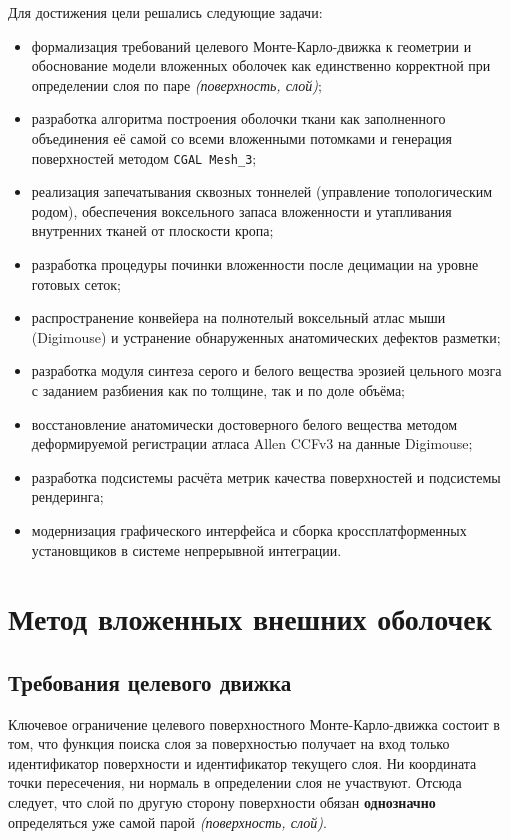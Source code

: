 \documentclass[a4paper,14pt]{article}
\begin{document}
Для достижения цели решались следующие задачи:
\begin{itemize}
    \item формализация требований целевого Монте-Карло-движка к геометрии и обоснование модели вложенных оболочек как единственно корректной при определении слоя по паре \emph{(поверхность, слой)};
    \item разработка алгоритма построения оболочки ткани как заполненного объединения её самой со всеми вложенными потомками и генерация поверхностей методом \texttt{CGAL Mesh\_3};
    \item реализация запечатывания сквозных тоннелей (управление топологическим родом), обеспечения воксельного запаса вложенности и утапливания внутренних тканей от плоскости кропа;
    \item разработка процедуры починки вложенности после децимации на уровне готовых сеток;
    \item распространение конвейера на полнотелый воксельный атлас мыши (Digimouse) и устранение обнаруженных анатомических дефектов разметки;
    \item разработка модуля синтеза серого и белого вещества эрозией цельного мозга с заданием разбиения как по толщине, так и по доле объёма;
    \item восстановление анатомически достоверного белого вещества методом деформируемой регистрации атласа Allen CCFv3 на данные Digimouse;
    \item разработка подсистемы расчёта метрик качества поверхностей и подсистемы рендеринга;
    \item модернизация графического интерфейса и сборка кроссплатформенных установщиков в системе непрерывной интеграции.
\end{itemize}

\newpage
\section{Метод вложенных внешних оболочек}

\subsection{Требования целевого движка}
Ключевое ограничение целевого поверхностного Монте-Карло-движка состоит в том, что функция поиска слоя за поверхностью получает на вход только идентификатор поверхности и идентификатор текущего слоя. Ни координата точки пересечения, ни нормаль в определении слоя не участвуют. Отсюда следует, что слой по другую сторону поверхности обязан \textbf{однозначно} определяться уже самой парой \emph{(поверхность, слой)}.
\end{document}
